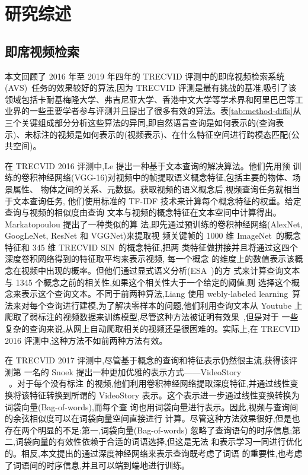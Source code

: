 \chapter{研究综述}

\section{即席视频检索}

本文回顾了 2016 年至 2019 年四年的 TRECVID 评测中的即席视频检索系统(AVS)~\cite{awad2016trecvid,awad2017trecvid,awad2018trecvid,awad2019trecvid}任务的效果较好的算法,因为 TRECVID 评测是最有挑战的基准,吸引了该领域包括卡耐基梅隆大学、弗吉尼亚大学、香港中文大学等学术界和阿里巴巴等工业界的一些重要学者参与评测并且提出了很多有效的算法。表\ref{tab:method-diffs}从三个关键组成部分分析这些算法的异同,即自然语言查询是如何表示的(查询表示)、未标注的视频是如何表示的(视频表示)、在什么特征空间进行跨模态匹配(公共空间)。



在 TRECVID 2016 评测中,Le \etal\cite{le2016nii}提出一种基于文本查询的解决算法。他们先用预
训练的卷积神经网络(VGG-16)对视频中的帧提取语义概念特征,包括主要的物体、场景属性、
物体之间的关系、元数据。获取视频的语义概念后,视频查询任务就相当于文本查询任务,
他们使用标准的 TF-IDF 技术来计算每个概念特征的权重。给定查询与视频的相似度由查询
文本与视频的概念特征在文本空间中计算得出。Markatopoulou \etal\cite{foteini2016iti}提出了一种类似的算
法,即先通过预训练的卷积神经网络(AlexNet, GoogLeNet, ResNet 和 VGGNet)来提取视
频关键帧的 1000 维 ImageNet~\cite{russakovsky2015imagenet}的概念特征和 345 维 TRECVID SIN~\cite{smeaton2009high}的概念特征,把两
类特征做拼接并且将通过这四个深度卷积网络得到的特征取平均来表示视频, 每一个概念
的维度上的数值表示该概念在视频中出现的概率。但他们通过显式语义分析(ESA~\cite{gabrilovich2007computing})的方
式来计算查询文本与 1345 个概念之前的相关性,如果这个相关性大于一个给定的阈值,则
选择这个概念来表示这个查询文本。不同于前两种算法,Liang \etal\cite{liang2016inf}使用 webly-labeled
learning~\cite{liang2016learning}算法来对每个查询进行建模,为了解决零样本的问题,他们利用查询文本从
Youtube 上爬取了弱标注的视频数据来训练模型,尽管这种方法被证明有效果~\cite{kordumova2015best},但是对于
一些复杂的查询来说,从网上自动爬取相关的视频还是很困难的。实际上,在 TRECVID 2016
评测中,这种方法不如前两种方法有效。

在 TRECVID 2017 评测中,尽管基于概念的查询和特征表示仍然很主流,获得该评测第
一名的 Snoek \etal\cite{snoek2017university}提出一种更加优雅的表示方式——VideoStory\\~\cite{habibian2014videostory}。对于每个没有标注
的视频,他们利用卷积神经网络提取深度特征,并通过线性变换将该特征转换到所谓的
VideoStory 表示。这个表示进一步通过线性变换转换为词袋向量(Bag-of-words),而每个查
询也用词袋向量进行表示。因此,视频与查询间的余弦相似度可以在词袋向量空间直接进行
计算。尽管这种方法效果很好,但是也存在两个明显的不足:第一,词袋向量(Bag-of-words)
忽略了查询语句的时序信息;第二,词袋向量的有效性依赖于合适的词语选择,但这是无法
和表示学习一同进行优化的。相反,本文提出的通过深度神经网络来表示查询既考虑了词语
的重要性,也考虑了词语间的时序信息,并且可以端到端地进行训练。

